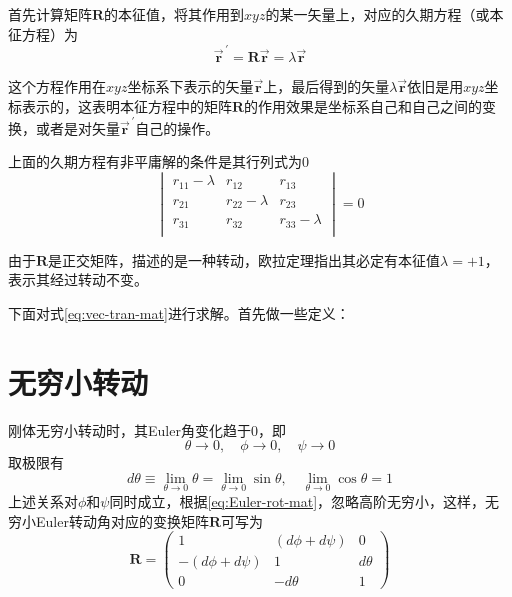 首先计算矩阵$\bm{R}$的本征值，将其作用到$xyz$的某一矢量上，对应的久期方程（或本征方程）为
\begin{equation}
    \vec{\bm{r}}^{\,\prime} = \bm{R}\vec{\bm{r}} = \lambda\vec{\bm{r}}
\end{equation}
\begin{note}
    这个方程作用在$xyz$坐标系下表示的矢量$\vec{\bm{r}}$上，最后得到的矢量$\lambda\vec{\bm{r}}$依旧是用$xyz$坐标表示的，这表明本征方程中的矩阵$\bm{R}$的作用效果是坐标系自己和自己之间的变换，或者是对矢量$\vec{\bm{r}}^{\,\prime}$自己的操作。
\end{note}

上面的久期方程有非平庸解的条件是其行列式为0
\begin{equation}
    \begin{vmatrix}
        r_{11} - \lambda & r_{12}           & r_{13} \\
        r_{21}           & r_{22} - \lambda & r_{23} \\
        r_{31}           & r_{32}           & r_{33} - \lambda \\
    \end{vmatrix}
    = 0
    \label{eq:vec-tran-mat}
\end{equation}
\begin{note}
    由于$\bm{R}$是正交矩阵，描述的是一种转动，欧拉定理指出其必定有本征值$\lambda = +1$，表示其经过转动不变。
\end{note}
下面对式\cref{eq:vec-tran-mat}进行求解。首先做一些定义：


\section{无穷小转动}
刚体无穷小转动时，其Euler角变化趋于0，即
\begin{equation*}
	\theta\rightarrow 0, \quad \phi\rightarrow 0, \quad \psi\rightarrow 0
\end{equation*}
取极限有
\begin{equation*}
	d\theta \equiv \lim_{\theta\rightarrow 0} \theta = \lim_{\theta\rightarrow 0} \sin{\theta}, \quad \lim_{\theta\rightarrow 0} \cos{\theta} = 1
\end{equation*}
上述关系对$\phi$和$\psi$同时成立，根据\cref{eq:Euler-rot-mat}，忽略高阶无穷小，这样，无穷小Euler转动角对应的变换矩阵$\bm{R}$可写为
\begin{equation}
	\bm{R} = \begin{pmatrix}
		1                 &  (d\phi + d\psi)  &    0 \\
		-(d\phi + d\psi)  &  1                & d\theta \\
		0                 &  - d\theta        & 1
	\end{pmatrix}
\end{equation}
